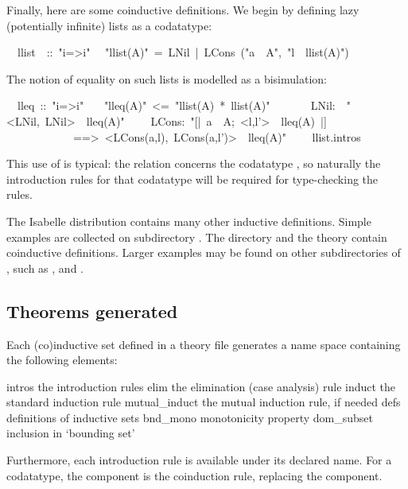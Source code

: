Finally, here are some coinductive definitions.  We begin by defining
lazy (potentially infinite) lists as a codatatype:
\begin{isabelle}
\ \ llist\ \ ::\ "i=>i"\isanewline
{}\isanewline
\ \ "llist(A)"\ =\ LNil\ |\ LCons\ ("a\ \isasymin \ A",\ "l\ \isasymin \ llist(A)")\isanewline
\end{isabelle}

The notion of equality on such lists is modelled as a bisimulation:
\begin{isabelle}
\ \ lleq\ ::\ "i=>i"\isanewline
{}\isanewline
\ \ \ "lleq(A)"\ <=\ "llist(A)\ *\ llist(A)"\isanewline
\ \ \isanewline
\ \ \ \ LNil:\ \ "<LNil,\ LNil>\ \isasymin \ lleq(A)"\isanewline
\ \ \ \ LCons:\ "[|\ a\ \isasymin \ A;\ <l,l'>\ \isasymin \ lleq(A)\ |]\ \isanewline
\ \ \ \ \ \ \ \ \ \ \ \ ==>\ <LCons(a,l),\ LCons(a,l')>\ \isasymin \ lleq(A)"\isanewline
\ \ \ \ llist.intros
\end{isabelle}
This use of  is typical: the relation concerns the
codatatype , so naturally the introduction rules for that
codatatype will be required for type-checking the rules.

The Isabelle distribution contains many other inductive definitions.  Simple
examples are collected on subdirectory .  The directory
 and the theory  contain coinductive
definitions.  Larger examples may be found on other subdirectories of
, such as , and .


\subsection{Theorems generated}

Each (co)inductive set defined in a theory file generates a name space
containing the following elements:
\begin{ttbox}\isastyleminor
intros        \textrm{the introduction rules}
elim          \textrm{the elimination (case analysis) rule}
induct        \textrm{the standard induction rule}
mutual_induct \textrm{the mutual induction rule, if needed}
defs          \textrm{definitions of inductive sets}
bnd_mono      \textrm{monotonicity property}
dom_subset    \textrm{inclusion in `bounding set'}
\end{ttbox}
Furthermore, each introduction rule is available under its declared
name. For a codatatype, the component  is the coinduction rule,
replacing the  component.


